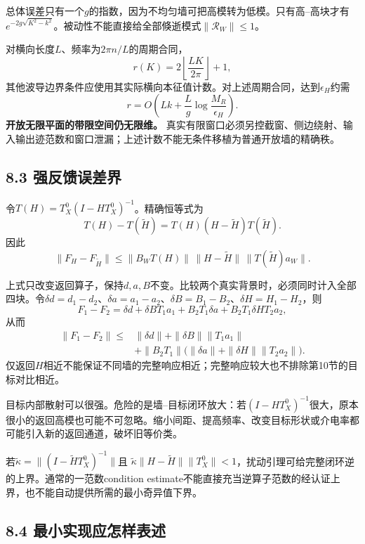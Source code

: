 \documentclass[
  10pt,
  a4paper,
]{article}
\begin{document}
总体误差只有一个\(g\)的指数，因为不均匀墙可把高模转为低模。只有高--高块才有\(e^{-2g\sqrt{K^2-k^2}}\)。被动性不能直接给全部倏逝模式\(\|\mathcal R_W\|\le1\)。

对横向长度\(L\)、频率为\(2\pi n/L\)的周期合同， \[
r(K)=2\left\lfloor\frac{LK}{2\pi}\right\rfloor+1,
\]
其他波导边界条件应使用其实际横向本征值计数。对上述周期合同，达到\(\epsilon_H\)约需
\[
r=O\left(Lk+\frac Lg\log\frac{M_R}{\epsilon_H}\right).
\] \textbf{开放无限平面的带限空间仍无限维。}
真实有限窗口必须另控截窗、侧边绕射、输入输出迹范数和窗口泄漏；上述计数不能无条件移植为普通开放墙的精确秩。

\hypertarget{ux5f3aux53cdux9988ux8befux5deeux754c}{%
\subsection{8.3
强反馈误差界}\label{ux5f3aux53cdux9988ux8befux5deeux754c}}

令\(T(H)=T_X^0(I-HT_X^0)^{-1}\)。精确恒等式为 \[
T(H)-T(\widetilde H)
=T(H)(H-\widetilde H)T(\widetilde H).
\] 因此 \[
\boxed{
\|F_H-F_{\widetilde H}\|
\le
\|B_WT(H)\|\,
\|H-\widetilde H\|\,
\|T(\widetilde H)a_W\|.
}
\]

上式只改变返回算子，保持\(d,a,B\)不变。比较两个真实背景时，必须同时计入全部四块。令\(\delta d=d_1-d_2\)、\(\delta a=a_1-a_2\)、\(\delta B=B_1-B_2\)、\(\delta H=H_1-H_2\)，则
\[
F_1-F_2=\delta d+\delta B T_1a_1+B_2T_1\delta a+B_2T_1\delta H T_2a_2,
\] 从而 \[
\begin{aligned}
\|F_1-F_2\|\le{}&\|\delta d\|+\|\delta B\|\|T_1a_1\|\\
&+\|B_2T_1\|\bigl(\|\delta a\|+\|\delta H\|\|T_2a_2\|\bigr).
\end{aligned}
\]
仅返回\(H\)相近不能保证不同墙的完整响应相近；完整响应较大也不排除第10节的目标对比相近。

目标内部散射可以很强。危险的是墙--目标闭环放大：若\((I-HT_X^0)^{-1}\)很大，原本很小的返回高模也可能不可忽略。缩小间距、提高频率、改变目标形状或介电率都可能引入新的返回通道，破坏旧等价类。

若\(\widetilde\kappa=\|(I-\widetilde H T_X^0)^{-1}\|\)且
\(\widetilde\kappa\|H-\widetilde H\|\|T_X^0\|<1\)，扰动引理可给完整闭环逆的上界。通常的一范数condition
estimate不能直接充当逆算子范数的经认证上界，也不能自动提供所需的最小奇异值下界。

\hypertarget{ux6700ux5c0fux5b9eux73b0ux5e94ux600eux6837ux8868ux8ff0}{%
\subsection{8.4
最小实现应怎样表述}\label{ux6700ux5c0fux5b9eux73b0ux5e94ux600eux6837ux8868ux8ff0}}
\end{document}
